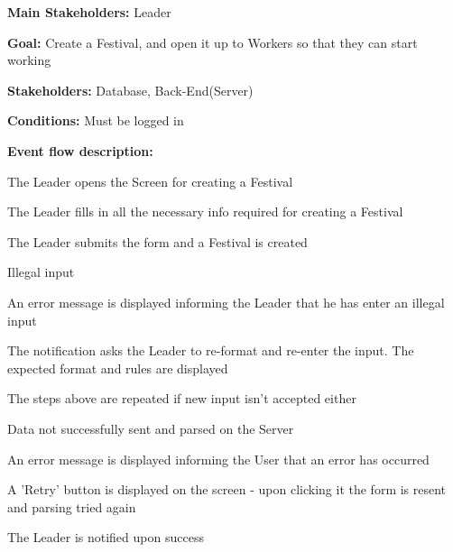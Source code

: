				\noindent {}
				\begin{packed_item}
					\item \textbf{Main Stakeholders:} Leader
					\item \textbf{Goal:} Create a Festival, and open it up to Workers so that they can start working
					\item \textbf{Stakeholders: } Database, Back-End(Server)
					\item \textbf{Conditions: } Must be logged in
					\item \textbf{Event flow description: }
					\begin{packed_enum}
						\item The Leader opens the Screen for creating a Festival
						\item The Leader fills in all the necessary info required for creating a Festival
						\item The Leader submits the form and a Festival is created
					\end{packed_enum}
					
					\begin{packed_item}
						\item[2.a] Illegal input
						\item[] \begin{packed_enum}
							\item An error message is displayed informing the Leader that he has enter an illegal input
							\item The notification asks the Leader to re-format and re-enter the input. The expected format and rules are displayed
							\item The steps above are repeated if new input isn't accepted either
						\end{packed_enum}
						
						\item[3.a] Data not successfully sent and parsed on the Server
						\item[] \begin{packed_enum}
							\item An error message is displayed informing the User that an error has occurred
							\item A 'Retry' button is displayed on the screen - upon clicking it the form is resent and parsing tried again
							\item The Leader is notified upon success
						\end{packed_enum}
						
					\end{packed_item}
				\end{packed_item}
			
